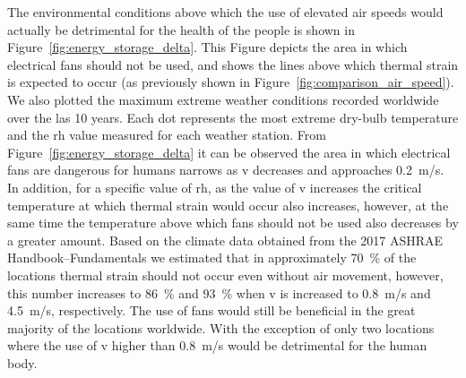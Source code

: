 The environmental conditions above which the use of elevated air speeds would actually be detrimental for the health of the people is shown in Figure~\ref{fig:energy_storage_delta}.
This Figure depicts the area in which electrical fans should not be used, and shows the lines above which thermal strain is expected to occur (as previously shown in Figure~\ref{fig:comparison_air_speed}).
We also plotted the maximum extreme weather conditions recorded worldwide over the las 10 years.
Each dot represents the most extreme dry-bulb temperature and the \ac{rh} value measured for each weather station.
From Figure~\ref{fig:energy_storage_delta} it can be observed the area in which electrical fans are dangerous for humans narrows as \ac{v} decreases and approaches 0.2~m/s.
In addition, for a specific value of \ac{rh}, as the value of \ac{v} increases the critical temperature at which thermal strain would occur also increases, however, at the same time the temperature above which fans should not be used also decreases by a greater amount.
Based on the climate data obtained from the 2017 ASHRAE Handbook--Fundamentals we estimated that in approximately 70~\% of the locations thermal strain should not occur even without air movement, however, this number increases to 86~\% and 93~\% when \ac{v} is increased to 0.8~m/s and 4.5~m/s, respectively.
The use of fans would still be beneficial in the great majority of the locations worldwide.
With the exception of only two locations where the use of \ac{v} higher than 0.8~m/s would be detrimental for the human body.



